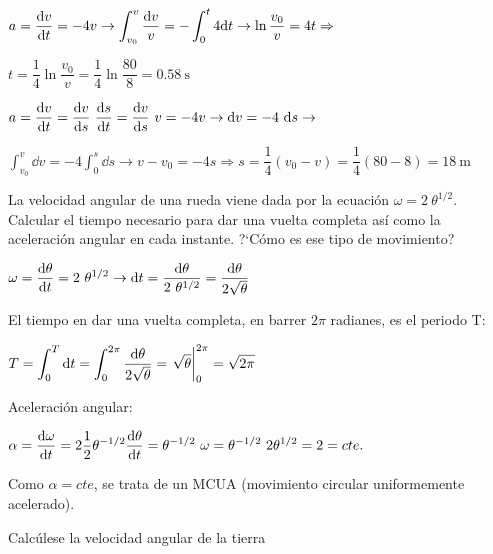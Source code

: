 $\displaystyle a=\dv{v}{t}=-4v \to \int_{v_0}^v \dfrac{\dd v}{v}=-\int_0^t 4 \dd t \to \ln \dfrac {v_0}{v}=4t \Rightarrow $ 

$\displaystyle t=\dfrac 1 4 \ln \dfrac {v_0}{v}=\dfrac 1 4 \ln \dfrac {80}{8}=0.58\ \mathrm{s}$

$\displaystyle a=\dv{v}{t}=\dv{v}{s}\ \dv{s}{t}=\dv{v}{s} \ v=-4v \to \dd v=-4 \ \dd s \to $

$\displaystyle \int_{v_0}^v
 \dd v=-4\int_0^s \dd s \to v-v_0=-4s \Rightarrow s=\dfrac 1 4 (v_0-v)=\dfrac 1 4 (80-8)=18\ \mathrm{m}$

\vspace{10mm} %
\begin{prob}
La velocidad angular de una rueda viene dada por la ecuación $\omega=2\ \theta^{1/2}$. Calcular el tiempo necesario para dar una vuelta completa así como la aceleración angular en cada instante. ?`Cómo es ese tipo de movimiento?	
\end{prob}
$\omega=\displaystyle \dv{\theta}{t}=2\ \theta^{1/2} \to \dd t=\dfrac{\dd \theta}{2\ \theta^{1/2}}=\dfrac{\dd \theta}{2\sqrt{\theta}}$

El tiempo en dar una vuelta completa, en barrer $2 \pi$ radianes, es el periodo T:

$\displaystyle T=\int_0^T \dd t=\int_0^{2 \pi} \dfrac{\dd \theta}{2\sqrt{\theta}}=\eval{\sqrt{\theta}}_0^{2 \pi}=\sqrt{2 \pi}$

Aceleración angular:

$\displaystyle \alpha= \dv{\omega}{t}=2 \frac 1 2 \theta^{-1/2} \dv{\theta}{t}=\theta^{-1/2} \ \omega =\theta^{-1/2}\ 2 \theta^{1/2}=2=cte.$ 

Como $\alpha=cte$, se trata de un MCUA (movimiento circular uniformemente acelerado).

\vspace{30mm} %

\begin{prob}
Calcúlese la velocidad angular de la tierra	
\end{prob}

